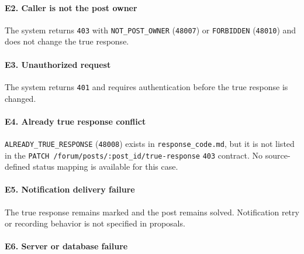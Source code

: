 \documentclass[12pt]{article}
\begin{document}
\hypertarget{sec:e2-caller-is-not-the-post-owner}{}
\paragraph*{E2. Caller is not the post owner}
\par\medskip

The system returns \texttt{403} with \texttt{NOT\_POST\_OWNER} (\texttt{48007}) or \texttt{FORBIDDEN} (\texttt{48010}) and does not change the true response.
\par\medskip

\hypertarget{sec:e3-unauthorized-request}{}
\paragraph*{E3. Unauthorized request}
\par\medskip

The system returns \texttt{401} and requires authentication before the true response is changed.
\par\medskip

\hypertarget{sec:e4-already-true-response-conflict}{}
\paragraph*{E4. Already true response conflict}
\par\medskip

\texttt{ALREADY\_TRUE\_RESPONSE} (\texttt{48008}) exists in \texttt{response\_code.md}, but it is not listed in the \texttt{PATCH /forum/posts/:post\_id/true-response} \texttt{403} contract. No source-defined status mapping is available for this case.
\par\medskip

\hypertarget{sec:e5-notification-delivery-failure}{}
\paragraph*{E5. Notification delivery failure}
\par\medskip

The true response remains marked and the post remains solved. Notification retry or recording behavior is not specified in proposals.
\par\medskip

\hypertarget{sec:e6-server-or-database-failure}{}
\paragraph*{E6. Server or database failure}
\par\medskip
\end{document}
